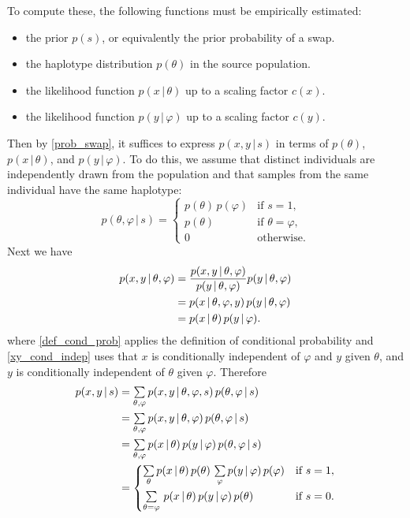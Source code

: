 \documentclass[12pt]{article}
\begin{document}
To compute these, the following functions must be empirically estimated:
\begin{itemize}
\item the prior $p(s)$, or equivalently the prior probability of a swap.
\item the haplotype distribution $p(\theta)$ in the source population.
\item the likelihood function $p(x \, | \, \theta)$ up to a scaling factor $c(x)$.
\item the likelihood function $p(y \, | \, \varphi)$ up to a scaling factor $c(y)$.
\end{itemize}
Then by \eqref{prob_swap}, it suffices to express $p(x,y \, | \, s)$ in terms of $p(\theta)$, $p(x \, | \, \theta)$, and $p( y \, | \, \varphi)$.  To do this, we assume that distinct individuals are independently drawn from the population and that samples from the same individual have the same haplotype:
\begin{equation}
\label{theta_phi_cond_indep}
p(\theta, \varphi \, | \, s) =
  \begin{cases}
   p(\theta) \, p(\varphi) & \text{if } s = 1, \\
   p(\theta) & \text{if } \theta = \varphi, \\
   0 & \text{otherwise.}
  \end{cases}
\end{equation}
Next we have
\begin{align}
p(x,y \, | \, \theta, \varphi)
&= \frac{p(x,y \, | \, \theta, \varphi)}{p(y \, | \, \theta, \varphi)} p(y \, | \, \theta, \varphi) \notag \\
\label{def_cond_prob}
&= p(x \, | \, \theta, \varphi, y) \, p(y \, |  \, \theta, \varphi) \\
\label{xy_cond_indep}
&= p(x \, | \, \theta) \, p(y \, | \, \varphi).
\end{align}
where \eqref{def_cond_prob} applies the definition of conditional probability and \eqref{xy_cond_indep} uses that $x$ is conditionally independent of $\varphi$ and $y$ given $\theta$, and $y$ is conditionally independent of $\theta$ given $\varphi$. Therefore
\begin{align}
\label{total_prob}
p(x,y \, | \, s)
&=  \textstyle\sum\limits_{\theta,\varphi} p(x, y \, | \, \theta, \varphi, s) \, p(\theta, \varphi \, | \, s) \\
\label{xy_cond_indep_s}
&= \textstyle\sum\limits_{\theta, \varphi} p(x, y \, | \, \theta, \varphi) \, p(\theta, \varphi \, | \, s) \\
\label{apply_xy_cond_indep}
&= \textstyle\sum\limits_{\theta, \varphi} p(x \, | \, \theta) \, p(y \, | \, \varphi) \, p(\theta, \varphi \, | \, s) \\
\label{apply_theta_phi_cond_indep}
&=
  \begin{dcases}
   \textstyle\sum\limits_{\theta} p(x \, | \, \theta) \, p(\theta) \, \textstyle\sum\limits_{\varphi} p(y \, | \, \varphi) \, p(\varphi) & \text{if } s = 1, \\
   \textstyle\sum\limits_{\theta = \varphi}  \, p(x\,|\,\theta)  \, p(y \, | \, \varphi) \, p(\theta) & \text{if } s = 0. \\
  \end{dcases}
\end{align}
\end{document}
